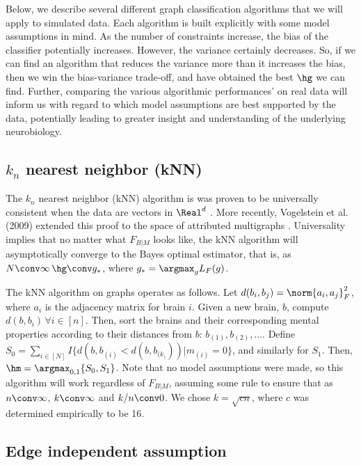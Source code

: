 Below, we describe several different graph classification algorithms that we will apply to simulated data.  Each algorithm is built explicitly with some model assumptions in mind.  As the number of constraints increase, the bias of the classifier potentially increases.  However, the variance certainly decreases.  So, if we can find an algorithm that reduces the variance more than it increases the bias, then we win the bias-variance trade-off, and have obtained the best $\hg$ we can find.  Further, comparing the various algorithmic performances' on real data will inform us with regard to which model assumptions are best supported by the data, potentially leading to greater insight and understanding of the underlying neurobiology.  

\subsection{$k_n$ nearest neighbor (kNN)} %
\label{sub:_k_n_nearest_neighbor_knn_}

The $k_n$ nearest neighbor (kNN) algorithm is was proven to be universally consistent when the data are vectors in $\Real^d$ \cite{Stone77}.  More recently, Vogelstein et al. (2009) extended this proof to the space of attributed multigraphs \cite{VVP09}.  Universality implies that no matter what $F_{B|M}$ looks like, the kNN algorithm will asymptotically converge to the Bayes optimal estimator, that is, as $N\conv\infty\, \hg \conv g_{\ast}$, where $g_{\ast}= \argmax_g L_F(g)$.  

The kNN algorithm on graphs operates as follows.  Let $d(b_i,b_j)=\norm{a_i,a_j}_F^2$, where $a_i$ is the adjacency matrix for brain $i$.  Given a new brain, $b$, compute $d(b,b_i)\, \forall i \in [n]$.  Then, sort the brains and their corresponding mental properties according to their distances from $b$: $b_{(1)}, b_{(2)}, \ldots$.  Define $S_0=\sum_{i \in [N]} I\{d(b,b_{(i)} < d(b,b_{(k_)})) | m_{(i)}=0\}$, and similarly for $S_1$. Then, $\hm=\argmax_{0,1} \{S_0,S_1\}$.  Note that no model assumptions were made, so this algorithm will work regardless of $F_{B|M}$, assuming some rule to ensure that as $n\conv \infty$, $k \conv \infty$ and $k/n \conv 0$.  We chose $k=\sqrt{c n}$, where $c$ was determined empirically to be 16.  



\subsection{Edge independent assumption} %
\label{sub:edge_indep}

